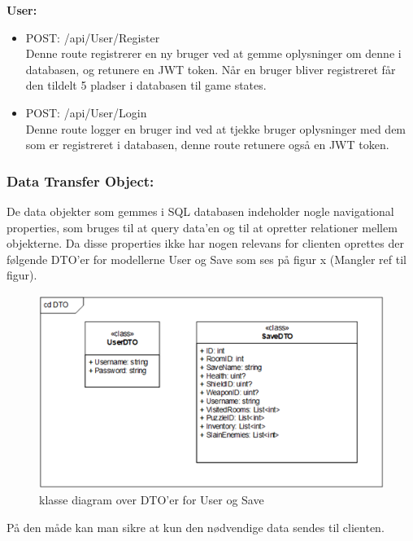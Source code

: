 \textbf{User:}\\
\begin{itemize}
\item POST: /api/User/Register\\
Denne route registrerer en ny bruger ved at gemme oplysninger om denne i databasen, og retunere en JWT token. Når en bruger bliver registreret får den tildelt 5 pladser i databasen til game states.
\item POST: /api/User/Login\\
Denne route logger en bruger ind ved at tjekke bruger oplysninger med dem som er registreret i databasen, denne route retunere også en JWT token.
\end{itemize}

\subsubsection{Data Transfer Object:}

De data objekter som gemmes i SQL databasen indeholder nogle navigational properties, som bruges til at query data’en og til at opretter relationer mellem objekterne. Da disse properties ikke har nogen relevans for clienten oprettes der følgende DTO’er for modellerne User og Save som ses på figur x (Mangler ref til figur).\\

\begin{figure}[H]
\centering
\includegraphics[width = \textwidth]{02-Body/Images/Backend_DTO.PNG}
\caption{klasse diagram over DTO'er for User og Save}
\label{fig:Design-Backend-DTO}
\end{figure}

På den måde kan man sikre at kun den nødvendige data sendes til clienten.\\

